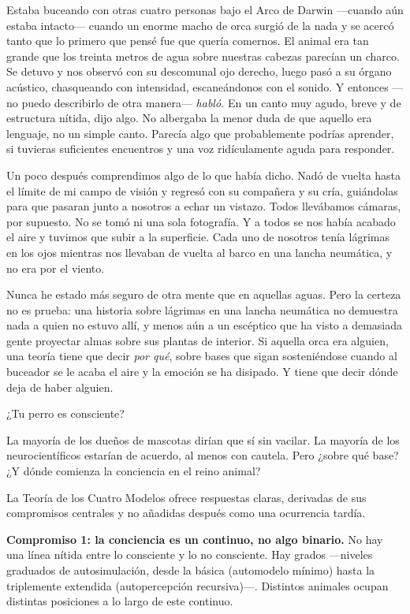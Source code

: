\documentclass[11pt, twoside, openright]{book}
\begin{document}
Estaba buceando con otras cuatro personas bajo el Arco de Darwin ---cuando aún estaba intacto--- cuando un enorme macho de orca surgió de la nada y se acercó tanto que lo primero que pensé fue que quería comernos. El animal era tan grande que los treinta metros de agua sobre nuestras cabezas parecían un charco. Se detuvo y nos observó con su descomunal ojo derecho, luego pasó a su órgano acústico, chasqueando con intensidad, escaneándonos con el sonido. Y entonces ---no puedo describirlo de otra manera--- \textit{habló.} En un canto muy agudo, breve y de estructura nítida, dijo algo. No albergaba la menor duda de que aquello era lenguaje, no un simple canto. Parecía algo que probablemente podrías aprender, si tuvieras suficientes encuentros y una voz ridículamente aguda para responder.

Un poco después comprendimos algo de lo que había dicho. Nadó de vuelta hasta el límite de mi campo de visión y regresó con su compañera y su cría, guiándolas para que pasaran junto a nosotros a echar un vistazo. Todos llevábamos cámaras, por supuesto. No se tomó ni una sola fotografía. Y a todos se nos había acabado el aire y tuvimos que subir a la superficie. Cada uno de nosotros tenía lágrimas en los ojos mientras nos llevaban de vuelta al barco en una lancha neumática, y no era por el viento.

Nunca he estado más seguro de otra mente que en aquellas aguas. Pero la certeza no es prueba: una historia sobre lágrimas en una lancha neumática no demuestra nada a quien no estuvo allí, y menos aún a un escéptico que ha visto a demasiada gente proyectar almas sobre sus plantas de interior. Si aquella orca era alguien, una teoría tiene que decir \textit{por qué}, sobre bases que sigan sosteniéndose cuando al buceador se le acaba el aire y la emoción se ha disipado. Y tiene que decir dónde deja de haber alguien.

¿Tu perro es consciente?

La mayoría de los dueños de mascotas dirían que sí sin vacilar. La mayoría de los neurocientíficos estarían de acuerdo, al menos con cautela. Pero ¿sobre qué base? ¿Y dónde comienza la conciencia en el reino animal?

La Teoría de los Cuatro Modelos ofrece respuestas claras, derivadas de sus compromisos centrales y no añadidas después como una ocurrencia tardía.

\textbf{Compromiso 1: la conciencia es un continuo, no algo binario.} No hay una línea nítida entre lo consciente y lo no consciente. Hay grados ---niveles graduados de autosimulación, desde la básica (automodelo mínimo) hasta la triplemente extendida (autopercepción recursiva)---. Distintos animales ocupan distintas posiciones a lo largo de este continuo.
\end{document}
